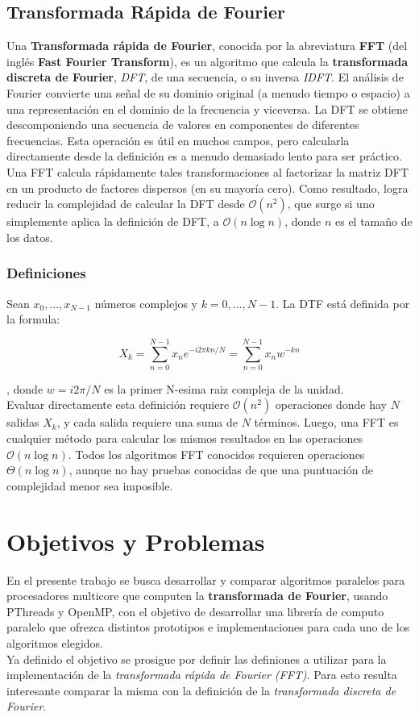 \documentclass[osajnl,twocolumn,showpacs,superscriptaddress,10pt,floatfix]{revtex4-1} %
\begin{document}
\subsection{Transformada Rápida de Fourier}

Una \textbf{Transformada rápida de Fourier}, conocida por la abreviatura \textbf{FFT} (del inglés \textbf{Fast Fourier Transform}),
es un algoritmo que calcula la \textbf{transformada discreta de Fourier}, \textit{DFT}, de una secuencia, o su inversa \textit{IDFT}.
El análisis de Fourier convierte una señal de su dominio original (a menudo tiempo o espacio) a una representación
en el dominio de la frecuencia y viceversa. La DFT se obtiene descomponiendo una secuencia de valores en componentes
de diferentes frecuencias. Esta operación es útil en muchos campos, pero calcularla directamente desde la definición
es a menudo demasiado lento para ser práctico. Una FFT calcula rápidamente tales transformaciones al factorizar
la matriz DFT en un producto de factores dispersos (en su mayoría cero). Como resultado, logra reducir la complejidad
de calcular la DFT desde $\mathcal{O}(n^{2})$, que surge si uno simplemente aplica la definición de DFT,
a $\mathcal{O}(n \log{} n)$, donde $n$ es el tamaño de los datos.

\subsubsection{Definiciones}

Sean $x_{0}, \ldots, x_{N-1}$ números complejos y $k = 0, \ldots, N-1$. La DTF está definida por la formula:

\[
    X_{k} = \sum_{n = 0}^{N-1} x_{n} e^{-i2 \pi kn / N} = \sum_{n = 0}^{N-1} x_{n} w^{-kn}
\]

, donde $w = i2 \pi / N$ es la primer N-esima raiz compleja de la unidad. \\

Evaluar directamente esta definición requiere $\mathcal{O}(n^{2})$ operaciones donde hay $N$ salidas $X_{k}$, y cada
salida requiere una suma de $N$ términos. Luego, una FFT es cualquier método para calcular los mismos resultados
en las operaciones $\mathcal{O}(n \log{} n)$. Todos los algoritmos FFT conocidos requieren operaciones $\mathcal{\Theta}(n \log{} n)$,
aunque no hay pruebas conocidas de que una puntuación de complejidad menor sea imposible.

\section{Objetivos y Problemas}

En el presente trabajo se busca desarrollar y comparar algoritmos paralelos para procesadores multicore que computen
la \textbf{transformada de Fourier}, usando PThreads y OpenMP, con el objetivo de desarrollar una librería de computo
paralelo que ofrezca distintos prototipos e implementaciones para cada uno de los algoritmos elegidos. \\

Ya definido el objetivo se prosigue por definir las definiones a utilizar para la implementación de la
\textit{transformada rápida de Fourier (FFT)}. Para esto resulta interesante comparar la misma con la
definición de la \textit{transformada discreta de Fourier}.
\end{document}
